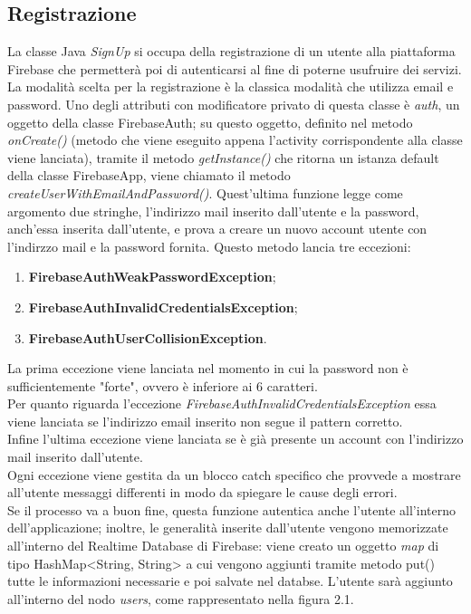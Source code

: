 \documentclass[a4paper,11pt,twoside,openright]{report}
\begin{document}
\subsection{Registrazione}
La classe Java \textit{SignUp} si occupa della registrazione di un utente alla piattaforma Firebase che permetterà poi di autenticarsi al fine di poterne usufruire dei servizi.\\
La modalità scelta per la registrazione è la classica modalità che utilizza email e password. Uno degli attributi con modificatore privato di questa classe è \textit{auth}, un oggetto della classe FirebaseAuth; su questo oggetto, definito nel metodo \textit{onCreate()}\cite{3} (metodo che viene eseguito appena l'activity corrispondente alla classe viene lanciata), tramite il metodo \textit{getInstance()} che ritorna un istanza default della classe FirebaseApp, viene chiamato il metodo \textit{createUserWithEmailAndPassword()}\cite{4}. Quest'ultima funzione legge come argomento due stringhe, l'indirizzo mail inserito dall'utente e la password, anch'essa inserita dall'utente, e prova a creare un nuovo account utente con l'indirzzo mail e la password fornita. Questo metodo lancia tre eccezioni:

\begin{enumerate}
\item \textbf{FirebaseAuthWeakPasswordException};

\item \textbf{FirebaseAuthInvalidCredentialsException};

\item \textbf{FirebaseAuthUserCollisionException}.
\end{enumerate}

La prima eccezione viene lanciata nel momento in cui la password non è sufficientemente "forte", ovvero è inferiore ai 6 caratteri.\\
Per quanto riguarda l'eccezione \textit{FirebaseAuthInvalidCredentialsException} essa viene lanciata se l'indirizzo email inserito non segue il pattern corretto.\\
Infine l'ultima eccezione viene lanciata se è già presente un account con l'indirizzo mail inserito dall'utente.\\
Ogni eccezione viene gestita da un blocco catch specifico che provvede a mostrare all'utente messaggi differenti in modo da spiegare le cause degli errori.\\
 Se il processo va a buon fine, questa funzione autentica anche l'utente all'interno dell'applicazione; inoltre, le generalità inserite dall'utente vengono memorizzate all'interno del Realtime Database di Firebase: viene creato un oggetto \textit{map} di tipo HashMap<String, String> a cui vengono aggiunti tramite metodo put() tutte le informazioni necessarie e poi salvate nel databse. L'utente sarà aggiunto all'interno del nodo \textit{users}, come rappresentato nella figura 2.1.
\end{document}
